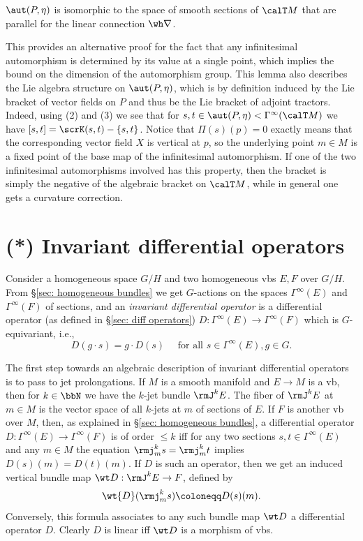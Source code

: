 \begin{cor}
    $\aut(P,\eta)$ is isomorphic to the space of smooth sections of $\calT M$ that are parallel for the linear connection $\wh\nabla$.
\end{cor}

This provides an alternative proof for the fact that any infinitesimal automorphism is determined by its value at a single point, which implies the bound on the dimension of the automorphism group. This lemma also describes the Lie algebra structure on $\aut(P,\eta)$, which is by definition induced by the Lie bracket of vector fields on $P$ and thus be the Lie bracket of adjoint tractors. Indeed, using (2) and (3) we see that for $s,t\in\aut(P,\eta)<\Gamma^\infty(\calT M)$ we have $[s,t]=\scrK(s,t)-\{s,t\}$. Notice that $\varPi(s)(p)=0$ exactly means that the corresponding vector field $X$ is vertical at $p$, so the underlying point $m\in M$ is a fixed point of the base map of the infinitesimal automorphism. If one of the two infinitesimal automorphisms involved has this property, then the bracket is simply the negative of the algebraic bracket on $\calT M$, while in general one gets a curvature correction.






\section{(*) Invariant differential operators}

Consider a homogeneous space $G\slash H$ and two homogeneous \glspl{vb} $E,F$ over $G\slash H$. From \S\ref{sec: homogeneous bundles} we get $G$-actions on the spaces $\Gamma^\infty(E)$ and $\Gamma^\infty(F)$ of sections, and an \emph{invariant differential operator} is a differential operator (as defined in \S\ref{sec: diff operators}) $D:\Gamma^\infty(E)\to \Gamma^\infty(F)$ which is $G$-equivariant, i.e., 
\[D(g\cdot s)=g\cdot D(s)\quad \text{ for all }s\in\Gamma^\infty(E),g\in G.\]

The first step towards an algebraic description of invariant differential operators is to pass to jet prolongations. If $M$ is a smooth manifold and $E\to M$ is a \gls{vb}, then for $k\in \bbN$ we have the $k$-jet bundle $\rmJ^k E$. The fiber of $\rmJ^k E$ at $m\in M$ is the vector space of all $k$-jets at $m$ of sections of $E$. If $F$ is another \gls{vb} over $M$, then, as explained in \S\ref{sec: homogeneous bundles}, a differential operator $D:\Gamma^\infty(E)\to \Gamma^\infty(F)$ is of order $\leq k$ iff for any two sections $s,t\in \Gamma^\infty(E)$ and any $m\in M$ the equation $\rmj^k_m s=\rmj^k_m t$ implies $D(s)(m)=D(t)(m)$. If $D$ is such an operator, then we get an induced vertical bundle map $\wt D:\rmJ^k E\to F$, defined by 
\[\wt{D}(\rmj^k_m s)\coloneqq D(s)(m).\]
Conversely, this formula associates to any such bundle map $\wt D$ a differential operator $D$. Clearly $D$ is linear iff $\wt D$ is a morphism of \glspl{vb}.

